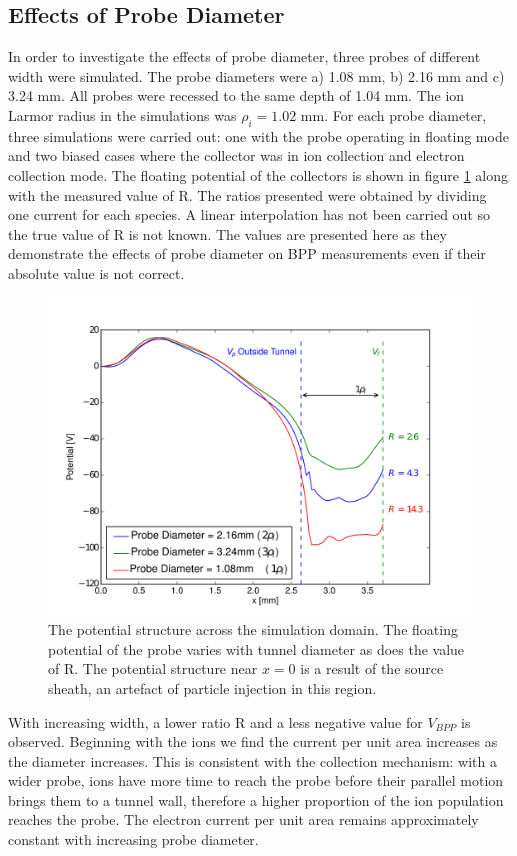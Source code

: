 \subsection{Effects of Probe Diameter} \label{Diameter} 
In order to investigate the effects of probe diameter, three probes of different width were simulated. The probe diameters were a)  1.08 mm,  b) 2.16 mm and c) 3.24 mm. All probes were recessed to the same depth of 1.04 mm. The ion Larmor radius in the simulations was $\rho_i =1.02$ mm. For each probe diameter, three simulations  were carried out: one with the probe operating in floating mode and two biased cases where the collector was in ion collection and electron collection mode. The floating potential of the collectors is shown in figure \ref{fig:float_diam} along with the measured value of R. The ratios presented were obtained by dividing one current for each species. A linear interpolation has not been carried out so the true value of R is not known. The values are presented here as they demonstrate the effects of probe diameter on BPP measurements even if their absolute value is not correct. 

\begin{figure}[H]
	\begin{center}
		\includegraphics[width=.75\textwidth]{figure6.pdf}
		\caption{The potential structure across the simulation domain. The floating potential of the probe varies with tunnel diameter as does the value of R. The potential structure near $x=0$ is a result of the source sheath, an artefact of particle injection in this region. }
		\label{fig:float_diam}
	\end{center}
\end{figure}

With increasing width, a lower ratio R and a less negative value for $V_{BPP}$ is observed. Beginning with the ions we find the current per unit area increases as the diameter increases. This is consistent with the collection mechanism: with a wider probe, ions have more time to reach the probe before their parallel motion brings them to a tunnel wall, therefore a higher proportion of the ion population reaches the probe. The electron current per unit area remains approximately constant with increasing probe diameter. 




